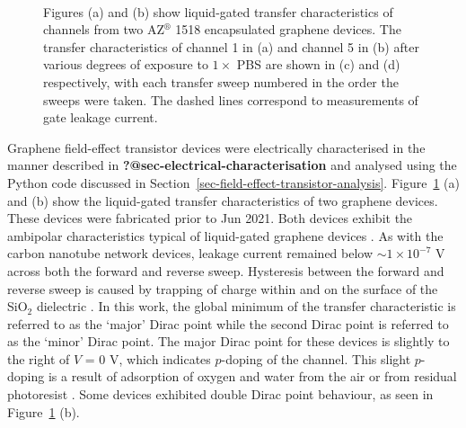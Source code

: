 \documentclass[
  a4paper,
]{scrbook}
\begin{document}
\begin{figure}
\begin{minipage}[t]{0.45\linewidth}
{{}

}

\end{minipage}%
%
\begin{minipage}[t]{0.01\linewidth}

{\centering 

~

}

\end{minipage}%

\caption{\label{fig-pristine-graphene}Figures (a) and (b) show
liquid-gated transfer characteristics of channels from two
AZ\(^\circledR\) 1518 encapsulated graphene devices. The transfer
characteristics of channel 1 in (a) and channel 5 in (b) after various
degrees of exposure to \(1 \times\) PBS are shown in (c) and (d)
respectively, with each transfer sweep numbered in the order the sweeps
were taken. The dashed lines correspond to measurements of gate leakage
current.}

\end{figure}

Graphene field-effect transistor devices were electrically characterised
in the manner described in \textbf{?@sec-electrical-characterisation}
and analysed using the Python code discussed in
Section~\ref{sec-field-effect-transistor-analysis}.
Figure~\ref{fig-pristine-graphene} (a) and (b) show the liquid-gated
transfer characteristics of two graphene devices. These devices were
fabricated prior to Jun 2021. Both devices exhibit the ambipolar
characteristics typical of liquid-gated graphene devices
\autocite{Heller2009a,Heller2010,Xia2010,Kireev2017}. As with the carbon
nanotube network devices, leakage current remained below
\(\sim 1 \times 10^{-7}\) V across both the forward and reverse sweep.
Hysteresis between the forward and reverse sweep is caused by trapping
of charge within and on the surface of the SiO\(_{2}\) dielectric
\autocite{Bartolomeo2011}. In this work, the global minimum of the
transfer characteristic is referred to as the `major' Dirac point while
the second Dirac point is referred to as the `minor' Dirac point. The
major Dirac point for these devices is slightly to the right of \(V\) =
0 V, which indicates \(p\)-doping of the channel. This slight
\(p\)-doping is a result of adsorption of oxygen and water from the air
or from residual photoresist \autocite{Cheng2011,Shin2012,Kireev2017}.
Some devices exhibited double Dirac point behaviour, as seen in
Figure~\ref{fig-pristine-graphene} (b).
\end{document}
